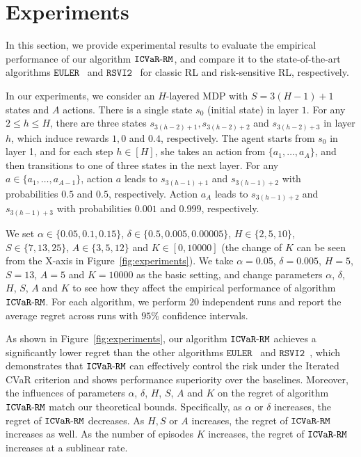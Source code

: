 \appendix

\renewcommand{\appendixpagename}{\centering \Large \textsc{Appendix}}
\appendixpage


\section{Experiments}\label{apx:experiments}

In this section, we provide experimental results to evaluate the empirical performance of our algorithm $\mathtt{ICVaR\mbox{-}RM}$, and compare it to the state-of-the-art algorithms $\mathtt{EULER}$~\citep{zanette2019tighter} and $\mathtt{RSVI2}$~\citep{fei2021exponential} for classic RL and risk-sensitive RL, respectively. 

In our experiments, we consider an $H$-layered MDP with $S=3(H-1)+1$ states and $A$ actions. There is a single state $s_0$ (initial state) in layer $1$. For any $2 \leq h \leq H$, there are three states $s_{3(h-2)+1}, s_{3(h-2)+2}$ and $s_{3(h-2)+3}$ in layer $h$, which induce rewards $1,0$ and $0.4$, respectively. The agent starts from $s_0$ in layer 1, and for each step $h\in[H]$, she takes an action from $\{a_1,\dots,a_{A}\}$, and then transitions to one of three states in the next layer. For any $a \in \{a_1,\dots,a_{A-1}\}$, action $a$ leads to $s_{3(h-1)+1}$ and $s_{3(h-1)+2}$ with probabilities $0.5$ and $0.5$, respectively. Action $a_{A}$ leads to $s_{3(h-1)+2}$ and $s_{3(h-1)+3}$ with probabilities $0.001$ and $0.999$, respectively.

We set $\alpha \in \{0.05, 0.1, 0.15\}$, $\delta \in \{0.5,0.005,0.00005\}$, $H \in \{2,5,10\}$, $S\in\{7,13,25\}$, $A\in\{3,5,12\}$ and $K\in[0,10000]$ (the change of $K$ can be seen from the X-axis in Figure~\ref{fig:experiments}). We take $\alpha=0.05$, $\delta=0.005$, $H=5$, $S=13$, $A=5$ and $K=10000$ as the basic setting, and change parameters $\alpha$, $\delta$, $H$, $S$, $A$ and $K$ to see how they affect the empirical performance of algorithm $\mathtt{ICVaR\mbox{-}RM}$. 
For each algorithm, we perform $20$ independent runs and report the average regret across runs with $95\%$ confidence intervals. 

As shown in Figure~\ref{fig:experiments}, our algorithm $\mathtt{ICVaR\mbox{-}RM}$ achieves a significantly lower regret than the other algorithms $\mathtt{EULER}$~\citep{zanette2019tighter} and $\mathtt{RSVI2}$~\citep{fei2021exponential}, which demonstrates that $\mathtt{ICVaR\mbox{-}RM}$ can effectively control the risk  under the Iterated CVaR criterion and shows performance superiority over the baselines.
Moreover, the influences of parameters $\alpha$, $\delta$, $H$, $S$, $A$ and $K$ on the regret of algorithm $\mathtt{ICVaR\mbox{-}RM}$ match our theoretical bounds.
Specifically, as $\alpha$ or $\delta$ increases, the regret of $\mathtt{ICVaR\mbox{-}RM}$ decreases. As $H,S$ or $A$ increases, the regret of $\mathtt{ICVaR\mbox{-}RM}$ increases as well. As the number of episodes $K$ increases, the regret of $\mathtt{ICVaR\mbox{-}RM}$ increases at a sublinear rate.

